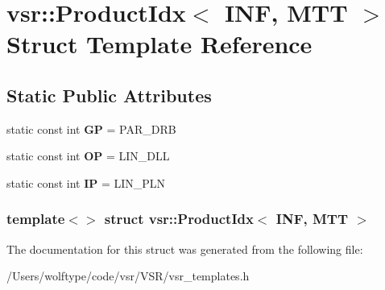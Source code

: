 \hypertarget{structvsr_1_1_product_idx_3_01_i_n_f_00_01_m_t_t_01_4}{\section{vsr\-:\-:Product\-Idx$<$ I\-N\-F, M\-T\-T $>$ Struct Template Reference}
\label{structvsr_1_1_product_idx_3_01_i_n_f_00_01_m_t_t_01_4}
}
\subsection*{Static Public Attributes}
\begin{DoxyCompactItemize}
\item 
\hypertarget{structvsr_1_1_product_idx_3_01_i_n_f_00_01_m_t_t_01_4_af4d88370ad3bd5b43e1e8416eb45c236}{static const int {\bfseries G\-P} = P\-A\-R\-\_\-\-D\-R\-B}\label{structvsr_1_1_product_idx_3_01_i_n_f_00_01_m_t_t_01_4_af4d88370ad3bd5b43e1e8416eb45c236}

\item 
\hypertarget{structvsr_1_1_product_idx_3_01_i_n_f_00_01_m_t_t_01_4_afa93c209652b624217e6f1a5c7c6cd9f}{static const int {\bfseries O\-P} = L\-I\-N\-\_\-\-D\-L\-L}\label{structvsr_1_1_product_idx_3_01_i_n_f_00_01_m_t_t_01_4_afa93c209652b624217e6f1a5c7c6cd9f}

\item 
\hypertarget{structvsr_1_1_product_idx_3_01_i_n_f_00_01_m_t_t_01_4_aa3bac3cf26bc802cb26a223e4a26f1b7}{static const int {\bfseries I\-P} = L\-I\-N\-\_\-\-P\-L\-N}\label{structvsr_1_1_product_idx_3_01_i_n_f_00_01_m_t_t_01_4_aa3bac3cf26bc802cb26a223e4a26f1b7}

\end{DoxyCompactItemize}
\subsubsection*{template$<$$>$ struct vsr\-::\-Product\-Idx$<$ I\-N\-F, M\-T\-T $>$}



The documentation for this struct was generated from the following file\-:\begin{DoxyCompactItemize}
\item 
/\-Users/wolftype/code/vsr/\-V\-S\-R/vsr\-\_\-templates.\-h\end{DoxyCompactItemize}
